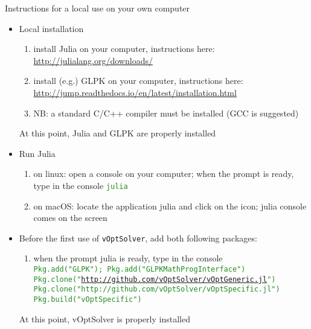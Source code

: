 \documentclass[10pt,xcolor=dvipsnames]{beamer}
\newcommand{\green}{\textcolor{ForestGreen}}
\begin{document}
%
% 
\begin{frame}{Instructions for a local use on your own computer}

\begin{itemize}
\item Local installation
\begin{enumerate}
  \item install Julia on your computer, instructions here:\\
  \quad \url{http://julialang.org/downloads/}
  \item install (e.g.) GLPK on your computer, instructions here:\\
  \quad \url{http://jump.readthedocs.io/en/latest/installation.html}  
  \item[] \hspace{-4mm}NB: a standard C/C++ compiler must be installed (GCC is suggested)
\end{enumerate}
\smallskip
At this point, Julia and GLPK are properly installed\medskip
  
\item Run Julia
\begin{enumerate}
  \item on linux: open a console on your computer;  when the prompt is ready, type in the console      \green{\texttt{julia}}
  \item on macOS: locate the application julia and click on the icon; julia console comes on the screen
\end{enumerate}
\medskip

\item Before the first use of \texttt{vOptSolver}, add both following packages:
\begin{enumerate}
  \item when the prompt {julia} is ready, type in the console \\ 
     \green{\texttt{Pkg.add("{GLPK}"); Pkg.add("GLPKMathProgInterface")}}    
     \green{\texttt{Pkg.clone("\url{http://github.com/vOptSolver/vOptGeneric.jl}")}}\\
     \green{\texttt{Pkg.clone("{http://github.com/vOptSolver/vOptSpecific.jl}")}}
     \green{\texttt{Pkg.build("{vOptSpecific}")}}         
\end{enumerate}  
\smallskip
At this point, vOptSolver is properly installed
\end{itemize}

\end{frame}
\end{document}
